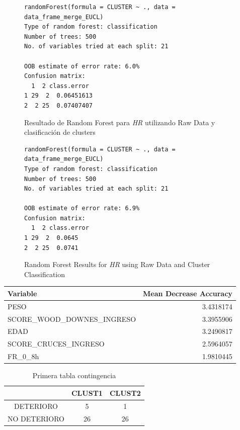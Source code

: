 \begin{figure}[H]
    \centering
    \begin{lstlisting}[frame=single, basicstyle=\small\ttfamily]
randomForest(formula = CLUSTER ~ ., data = data_frame_merge_EUCL)
Type of random forest: classification
Number of trees: 500
No. of variables tried at each split: 21

OOB estimate of error rate: 6.0%
Confusion matrix:
  1  2 class.error
1 29  2  0.06451613
2  2 25  0.07407407
    \end{lstlisting}
    \caption{Resultado de Random Forest para \textit{HR} utilizando Raw Data y clasificación de clusters}\label{fig:random_forest_result_1}
\end{figure}

\begin{figure}[H]
    \centering
    \begin{lstlisting}[basicstyle=\small\ttfamily]
randomForest(formula = CLUSTER ~ ., data = data_frame_merge_EUCL)
Type of random forest: classification
Number of trees: 500
No. of variables tried at each split: 21

OOB estimate of error rate: 6.9%
Confusion matrix:
  1  2 class.error
1 29  2  0.0645
2  2 25  0.0741
    \end{lstlisting}
    \caption{Random Forest Results for \textit{HR} using Raw Data and Cluster Classification}\label{fig:rf-results_2}
\end{figure}




\begin{tabular}{|l|r|}
    \hline
    Variable & Mean Decrease Accuracy \\
    \hline
    PESO & 3.4318174 \\
    SCORE\_WOOD\_DOWNES\_INGRESO & 3.3955906 \\
    EDAD & 3.2490817 \\
    SCORE\_CRUCES\_INGRESO & 2.5964057 \\
    FR\_0\_8h & 1.9810445 \\
    \hline
\end{tabular}
    
    
    

\begin{table}[H]
    \centering
    \begin{tabular}{|c|c|c|}
        \hline
               & CLUST1 & CLUST2 \\
        \hline
        DETERIORO & 5 & 1 \\
        NO DETERIORO & 26 & 26 \\
        \hline
    \end{tabular}
    \caption{Primera tabla contingencia}
    \label{tab:raw_data_contingencia}
    \end{table}
    
